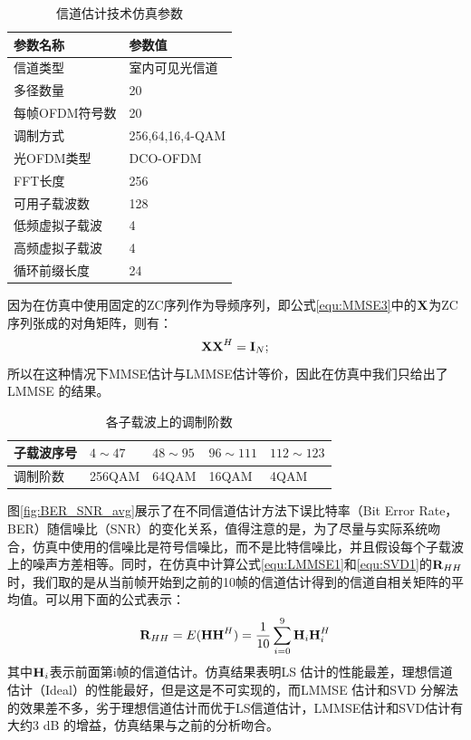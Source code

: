 \begin{table}[ht]
    \caption{信道估计技术仿真参数}
    \label{tab:Signle Color Channel Estimation Paramters}
    \centering
    \begin{tabular}{ll}
        \toprule
        参数名称                & 参数值\\
        \midrule
        信道类型                & 室内可见光信道\\
        多径数量                & 20 \\
        每帧OFDM符号数        & 20 \\
        调制方式                & 256,64,16,4-QAM\\
        光OFDM类型              & DCO-OFDM\\
        FFT长度                 & 256 \\
        可用子载波数            & 128 \\
        低频虚拟子载波          & 4  \\
        高频虚拟子载波          & 4  \\
        循环前缀长度            & 24 \\
        \bottomrule
    \end{tabular}
\end{table}
因为在仿真中使用固定的ZC序列作为导频序列，即公式\ref{equ:MMSE3}中的$\textbf X$为ZC序列张成的对角矩阵，则有：
\begin{equation}
\textbf X \textbf X^H = \textbf I_N;
\end{equation}
所以在这种情况下MMSE估计与LMMSE估计等价，因此在仿真中我们只给出了LMMSE 的结果。

\begin{table}[ht]
    \caption{各子载波上的调制阶数}
    \label{tab:modOrder}
    \centering
    \begin{tabular}{lllll}
        \toprule
        子载波序号    & $4\sim47$  & $48\sim95$  & $96\sim111$ & $112\sim123$ \\
        \midrule
        调制阶数      & 256QAM  & 64QAM  &16QAM & 4QAM    \\
        \bottomrule
    \end{tabular}
\end{table}
图\ref{fig:BER_SNR_avg}展示了在不同信道估计方法下误比特率（Bit Error Rate，BER）随信噪比（SNR）的变化关系，值得注意的是，为了尽量与实际系统吻合，仿真中使用的信噪比是符号信噪比，而不是比特信噪比，并且假设每个子载波上的噪声方差相等。同时，在仿真中计算公式\ref{equ:LMMSE1}和\ref{equ:SVD1}的$\textbf R_{HH}$时，我们取的是从当前帧开始到之前的10帧的信道估计得到的信道自相关矩阵的平均值。可以用下面的公式表示：
\begin{equation}
\textbf R_{HH} = E(\textbf H \textbf H^H)=\frac{1}{10}\sum_{i=0}^{9}\textbf H_i \textbf H_i^H
\end{equation}
其中$\textbf H_i$表示前面第i帧的信道估计。仿真结果表明LS 估计的性能最差，理想信道估计（Ideal）的性能最好，但是这是不可实现的，而LMMSE 估计和SVD 分解法的效果差不多，劣于理想信道估计而优于LS信道估计，LMMSE估计和SVD估计有大约3 dB 的增益，仿真结果与之前的分析吻合。

